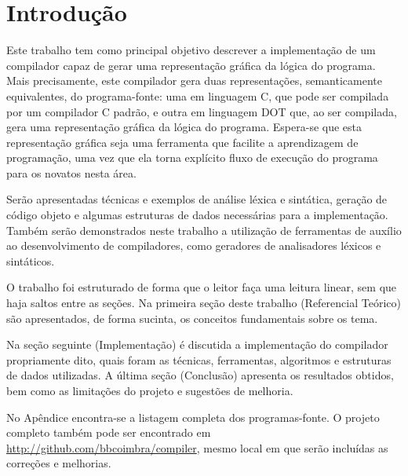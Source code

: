 \section{Introdução}
Este trabalho tem como principal objetivo descrever a implementação de um
compilador capaz de gerar uma representação gráfica da lógica do programa.
Mais precisamente, este compilador gera duas representações, semanticamente
equivalentes, do programa-fonte: uma em linguagem C, que pode ser compilada
por um compilador C padrão, e outra em linguagem DOT que, ao ser compilada,
gera uma representação gráfica da lógica do programa. Espera-se que esta
representação gráfica seja uma ferramenta que facilite a aprendizagem
de programação, uma vez que ela torna explícito fluxo de execução do
programa para os novatos nesta área.

Serão apresentadas técnicas e exemplos de análise léxica e sintática,
geração de código objeto e algumas estruturas de dados necessárias para a
implementação. Também serão demonstrados neste trabalho a utilização de
ferramentas de auxílio ao desenvolvimento de compiladores, como geradores de
analisadores léxicos e sintáticos.

O trabalho foi estruturado de forma que o leitor faça uma leitura linear,
sem que haja saltos entre as seções. Na primeira seção deste trabalho
(Referencial Teórico) são apresentados, de forma sucinta, os conceitos
fundamentais sobre os tema.

Na seção seguinte (Implementação) é discutida a implementação do
compilador propriamente dito, quais foram as técnicas, ferramentas,
algoritmos e estruturas de dados utilizadas. A última seção (Conclusão)
apresenta os resultados obtidos, bem como as limitações do projeto e
sugestões de melhoria.

No Apêndice encontra-se a listagem completa dos programas-fonte.
O projeto completo também pode ser encontrado em
\url{http://github.com/bbcoimbra/compiler}, mesmo local em que serão
incluídas as correções e melhorias.
